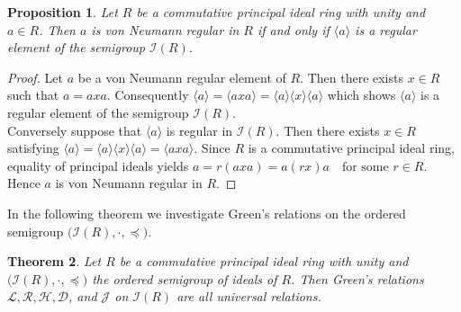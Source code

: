 \documentclass[12pt,a4paper]{amsart}
\theoremstyle{plain}
\newtheorem{theorem}{Theorem}[section]
\newtheorem{proposition}[theorem]{Proposition}
\theoremstyle{definition}
\begin{document}
\begin{proposition}
	Let $R$ be a commutative principal ideal ring with unity and $a \in R$.
	Then $a$ is von Neumann regular in $R$ if and only if
	$\langle a \rangle$ is a regular element of the semigroup
	$\mathcal{I}(R)$.
\end{proposition}
\begin{proof}
	Let $a$ be a von Neumann regular element of $R$. Then there exists $x \in R$ such that
$	a = axa.$
	Consequently $	\langle a\rangle = \langle axa\rangle
	= \langle a\rangle \langle x\rangle \langle a\rangle$
	which shows $\langle a\rangle$ is a regular element of the semigroup
	$\mathcal{I}(R)$.\\
		
	\noindent
	Conversely suppose that $\langle a\rangle$ is regular in $\mathcal{I}(R)$.
	Then there exists $x \in R$ satisfying
$	\langle a\rangle
	= \langle a\rangle \langle x\rangle \langle a\rangle
	= \langle axa\rangle.$
	Since $R$ is a commutative principal ideal ring, equality of principal ideals yields
$	a = r(axa) = a(rx)a
	\quad \text{for some } r \in R.$
Hence $a$ is von Neumann regular in $R$.
\end{proof}
In the following theorem we investigate Green’s relations
on the ordered semigroup $\big(\mathcal{I}(R), \cdot , \preccurlyeq\big)$.
\begin{theorem}
	Let $R$ be a commutative principal ideal ring with unity and 
	$\big(\mathcal{I}(R), \cdot , \preccurlyeq\big)$  the ordered semigroup of ideals of $R$.
	Then Green’s relations $\mathcal{L}, \mathcal{R}, \mathcal{H}, \mathcal{D}$, and $\mathcal{J}$ 	on $\mathcal{I}(R)$ are all universal relations.
\end{theorem}
\end{document}
